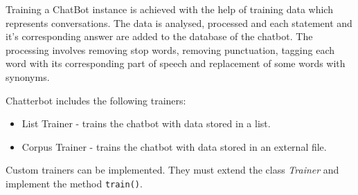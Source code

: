 \documentclass[12pt,a4paper]{article}
\newcommand{\captionstyle}[1] {
    \small{#1}
}
\begin{document}
Training a ChatBot instance is achieved with the help of training data which represents conversations. The data is analysed, processed and each statement and it's corresponding answer are added to the database of the chatbot. The processing involves removing stop words, removing punctuation, tagging each word with its corresponding part of speech and replacement of some words with synonyms.


Chatterbot includes the following trainers:
\begin{itemize}
    \item List Trainer - trains the chatbot with data stored in a list.
    \item Corpus Trainer - trains the chatbot with data stored in an external file.
\end{itemize}

Custom trainers can be implemented. They must extend the class \textit{Trainer} and implement the method \texttt{train()}.

%
%
%

\end{document}
